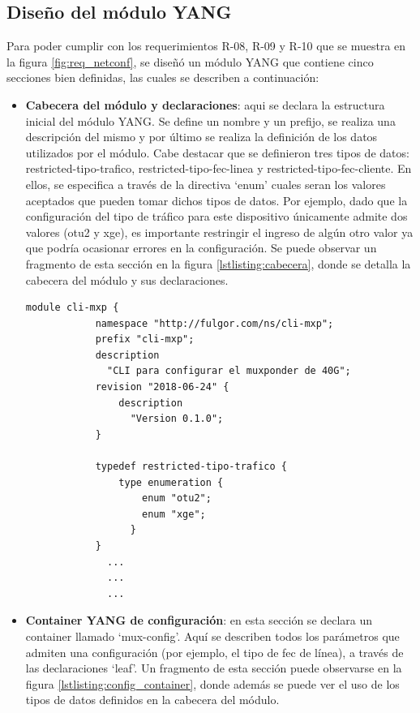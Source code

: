 \subsection{Diseño del módulo YANG}

Para poder cumplir con los requerimientos R-08, R-09 y R-10 que se muestra en la figura \ref{fig:req_netconf}, se diseñó un módulo YANG que contiene cinco secciones bien definidas, las cuales se describen a continuación: 

\begin{itemize}
	\item \textbf{Cabecera del módulo y declaraciones}: aqui se declara la estructura inicial del módulo YANG. Se define un nombre y un prefijo, se realiza una descripción del mismo y por último se realiza la definición de los datos utilizados por el módulo. Cabe destacar que se definieron tres tipos de datos: restricted-tipo-trafico, restricted-tipo-fec-linea y restricted-tipo-fec-cliente. En ellos, se especifica a través de la directiva ‘enum’ cuales seran los valores aceptados que pueden tomar dichos tipos de datos. Por ejemplo, dado que la configuración del tipo de tráfico para este dispositivo únicamente admite dos valores (otu2 y xge), es importante restringir el ingreso de algún otro valor ya que podría ocasionar errores en la configuración. Se puede observar un fragmento de esta sección en la figura \ref{lstlisting:cabecera}, donde se detalla la cabecera del módulo y sus declaraciones.  

  \newpage
    \begin{lstlisting}[language=SHELXL, caption=Cabecera del módulo YANG., label=lstlisting:cabecera]
        module cli-mxp {
            namespace "http://fulgor.com/ns/cli-mxp";
            prefix "cli-mxp";
            description
              "CLI para configurar el muxponder de 40G";
            revision "2018-06-24" {
                description
                  "Version 0.1.0";
            }

            typedef restricted-tipo-trafico {
                type enumeration {
                    enum "otu2";
                    enum "xge";
                  }
            }
              ...
              ...
              ...

    \end{lstlisting}

    \item \textbf{Container YANG de configuración}: en esta sección se declara un container llamado ‘mux-config’. Aquí se describen todos los parámetros que admiten una configuración (por ejemplo, el tipo de fec de línea), a través de las declaraciones ‘leaf’. Un fragmento de esta sección puede observarse en la figura \ref{lstlisting:config_container}, donde además se puede ver el uso de los tipos de datos definidos en la cabecera del módulo.
  

\end{itemize}
